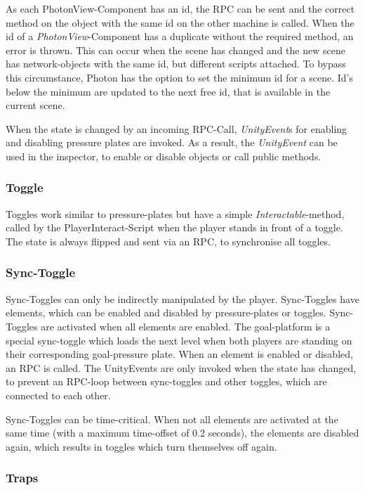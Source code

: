 As each PhotonView-Component has an id, the RPC can be sent and the correct method on the object with the same id on the other machine is called.
When the id of a \textit{PhotonView}-Component has a duplicate without the required method, an error is thrown.
This can occur when the scene has changed and the new scene has network-objects with the same id, but different scripts attached. To bypass this circumstance, Photon has the option to set the minimum id for a scene. Id's below the minimum are updated to the next free id, that is available in the current scene.

When the state is changed by an incoming RPC-Call, \textit{UnityEvent}s for enabling and disabling pressure plates are invoked. As a result, the \textit{UnityEvent} can be used in the inspector, to enable or disable objects or call public methods.

\subsubsection{Toggle}

Toggles work similar to pressure-plates but have a simple \textit{Interactable}-method, called by the PlayerInteract-Script when the player stands in front of a toggle. The state is always flipped and sent via an RPC, to synchronise all toggles.


\subsubsection{Sync-Toggle}

Sync-Toggles can only be indirectly manipulated by the player.
Sync-Toggles have elements, which can be enabled and disabled by pressure-plates or toggles. Sync-Toggles are activated when all elements are enabled. The goal-platform is a special sync-toggle which loads the next level when both players are standing on their corresponding goal-pressure plate.
When an element is enabled or disabled, an RPC is called.
The UnityEvents are only invoked when the state has changed, to prevent an RPC-loop between sync-toggles and other toggles, which are connected to each other.

Sync-Toggles can be time-critical. When not all elements are activated at the same time (with a maximum time-offset of 0.2 seconds), the elements are disabled again, which results in toggles which turn themselves off again.

\subsubsection{Traps}

